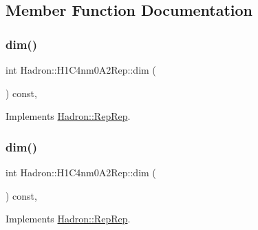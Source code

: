 \subsection{Member Function Documentation}
\mbox{\label{structHadron_1_1H1C4nm0A2Rep_afb094239f1c82d0594c2591d818ee1fa}} 
\subsubsection{\texorpdfstring{dim()}{dim()}\hspace{0.1cm}{\footnotesize\ttfamily [1/5]}}
{\footnotesize\ttfamily int Hadron\+::\+H1\+C4nm0\+A2\+Rep\+::dim (\begin{DoxyParamCaption}{ }\end{DoxyParamCaption}) const\hspace{0.3cm}{\ttfamily [inline]}, {\ttfamily [virtual]}}



Implements \mbox{\hyperlink{structHadron_1_1RepRep_a92c8802e5ed7afd7da43ccfd5b7cd92b}{Hadron\+::\+Rep\+Rep}}.

\mbox{\label{structHadron_1_1H1C4nm0A2Rep_afb094239f1c82d0594c2591d818ee1fa}} 
\subsubsection{\texorpdfstring{dim()}{dim()}\hspace{0.1cm}{\footnotesize\ttfamily [2/5]}}
{\footnotesize\ttfamily int Hadron\+::\+H1\+C4nm0\+A2\+Rep\+::dim (\begin{DoxyParamCaption}{ }\end{DoxyParamCaption}) const\hspace{0.3cm}{\ttfamily [inline]}, {\ttfamily [virtual]}}



Implements \mbox{\hyperlink{structHadron_1_1RepRep_a92c8802e5ed7afd7da43ccfd5b7cd92b}{Hadron\+::\+Rep\+Rep}}.

\mbox{\label{structHadron_1_1H1C4nm0A2Rep_afb094239f1c82d0594c2591d818ee1fa}} 
